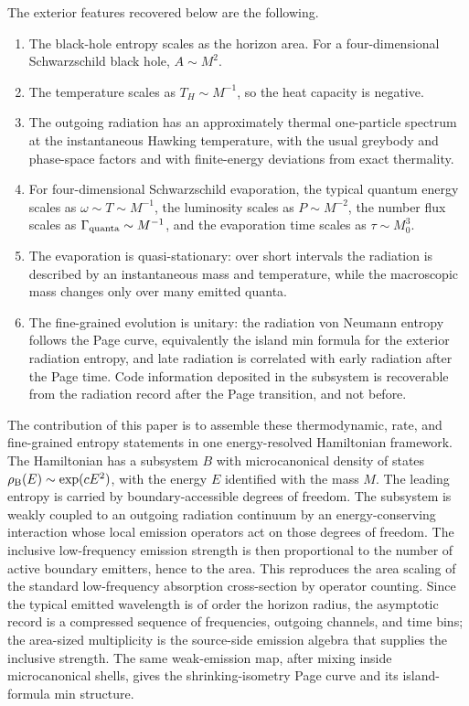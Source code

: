 \documentclass[12pt]{article}
\begin{document}
The exterior features recovered below are the following.
\begin{enumerate}
\item
The black-hole entropy scales as the horizon area.  For a four-dimensional
Schwarzschild black hole, $A\sim M^2$.
\item
The temperature scales as $T_H\sim M^{-1}$, so the heat capacity is negative.
\item
The outgoing radiation has an approximately thermal one-particle spectrum at
the instantaneous Hawking temperature, with the usual greybody and phase-space
factors and with finite-energy deviations from exact thermality.
\item
For four-dimensional Schwarzschild evaporation, the typical quantum energy
scales as $\omega\sim T\sim M^{-1}$, the luminosity scales as
$P\sim M^{-2}$, the number flux scales as
$\Gamma_{\rm quanta}\sim M^{-1}$, and the evaporation time scales as
$\tau\sim M_0^3$.
\item
The evaporation is quasi-stationary: over short intervals the radiation is
described by an instantaneous mass and temperature, while the macroscopic mass
changes only over many emitted quanta.
\item
The fine-grained evolution is unitary: the radiation von Neumann entropy
follows the Page curve, equivalently the island min formula for the exterior
radiation entropy, and late radiation is correlated with early radiation after
the Page time.  Code information deposited in the subsystem is recoverable
from the radiation record after the Page transition, and not before.
\end{enumerate}

The contribution of this paper is to assemble these thermodynamic, rate, and
fine-grained entropy statements in one energy-resolved Hamiltonian framework.
The Hamiltonian has a subsystem $B$ with microcanonical density of states
$\rho_{\rm B}(E)\sim \exp(cE^2)$, with the energy $E$ identified with the mass
$M$.  The leading entropy is carried by boundary-accessible degrees of
freedom.  The subsystem is weakly coupled to an outgoing radiation continuum by
an energy-conserving interaction whose local emission operators act on those
degrees of freedom.  The inclusive low-frequency emission strength is then
proportional to the number of active boundary emitters, hence to the area.
This reproduces the area scaling of the standard low-frequency absorption
cross-section by operator counting.  Since the typical emitted wavelength is
of order the horizon radius, the asymptotic record is a compressed sequence of
frequencies, outgoing channels, and time bins; the area-sized multiplicity is
the source-side emission algebra that supplies the inclusive strength.  The
same weak-emission map, after mixing inside microcanonical shells, gives the
shrinking-isometry Page curve and its island-formula min structure.
\end{document}
